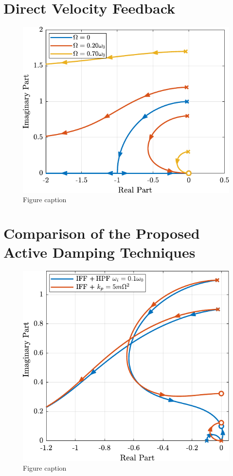 \documentclass{ISMA_USD2020}
\begin{document}
\section{Direct Velocity Feedback}
\label{sec:org6a1be4f}

\begin{figure}[htbp]
\centering
\includegraphics[scale=1]{figs/root_locus_dvf.pdf}
\caption{\label{fig:root_locus_dvf}Figure caption}
\end{figure}

\section{Comparison of the Proposed Active Damping Techniques}
\label{sec:orga9658c0}

\begin{figure}[htbp]
\centering
\includegraphics[scale=1]{figs/comp_root_locus.pdf}
\caption{\label{fig:comp_root_locus}Figure caption}
\end{figure}
\end{document}
